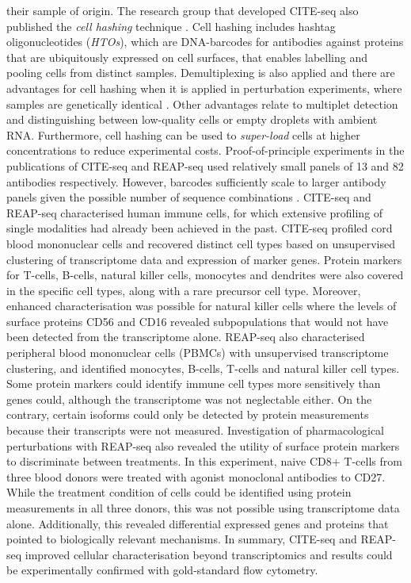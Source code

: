 \documentclass[times, twoside, watermark]{zHenriquesLab-StyleBioRxiv}
\begin{document}
their sample of origin. The research group that developed CITE-seq also published the \textit{cell hashing} technique \cite{Stoeckius2018}. Cell hashing includes hashtag oligonucleotides (\textit{HTOs}), which are DNA-barcodes for antibodies against proteins that are ubiquitously expressed on cell surfaces, that enables labelling and pooling cells from distinct samples. Demultiplexing is also applied and there are advantages for cell hashing when it is applied in perturbation experiments, where samples are genetically identical \cite{Stoeckius2018}. Other advantages relate to multiplet detection and distinguishing between low-quality cells or empty droplets with ambient RNA. Furthermore, cell hashing can be used to \textit{super-load} cells at higher concentrations to reduce experimental costs. Proof-of-principle experiments in the publications of CITE-seq and REAP-seq used relatively small panels of 13 and 82 antibodies respectively. However, barcodes sufficiently scale to larger antibody panels given the possible number of sequence combinations \cite{Stoeckius2017,Peterson2017}. \newline CITE-seq and REAP-seq characterised human immune cells, for which extensive profiling of single modalities had already been achieved in the past. CITE-seq profiled cord blood mononuclear cells and recovered distinct cell types based on unsupervised clustering of transcriptome data and expression of marker genes. Protein markers for T-cells, B-cells, natural killer cells, monocytes and dendrites were also covered in the specific cell types, along with a rare precursor cell type. Moreover, enhanced characterisation was possible for natural killer cells where the levels of surface proteins CD56 and CD16 revealed subpopulations that would not have been detected from the transcriptome alone. REAP-seq also characterised peripheral blood mononuclear cells (PBMCs) with unsupervised transcriptome clustering, and identified monocytes, B-cells, T-cells and natural killer cell types. Some protein markers could identify immune cell types more sensitively than genes could, although the transcriptome was not neglectable either. On the contrary, certain isoforms could only be detected by protein measurements because their transcripts were not measured. Investigation of pharmacological perturbations with REAP-seq also revealed the utility of surface protein markers to discriminate between treatments. In this experiment, naive CD8+ T-cells from three blood donors were treated with agonist monoclonal antibodies to CD27. While the treatment condition of cells could be identified using protein measurements in all three donors, this was not possible using transcriptome data alone. Additionally, this revealed differential expressed genes and proteins that pointed to biologically relevant mechanisms. In summary, CITE-seq and REAP-seq improved cellular characterisation beyond transcriptomics and results could be experimentally confirmed with gold-standard flow cytometry.
\end{document}

